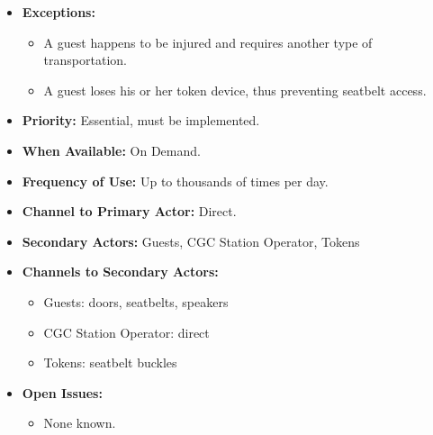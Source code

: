 \documentclass[12pt]{article}
\begin{document}
\begin{itemize}
        \item[]\textbf{Exceptions:}
            \begin{itemize}
                \item[] A guest happens to be injured and requires another type of transportation.
                \item[] A guest loses his or her token device, thus preventing seatbelt access.
            \end{itemize}

        \item[]\textbf{Priority:}
            Essential, must be implemented.

        \item[]\textbf{When Available:}
            On Demand.

        \item[]\textbf{Frequency of Use:}
            Up to thousands of times per day.
            
        \item[]\textbf{Channel to Primary Actor:}
            Direct.

        \item[]\textbf{Secondary Actors:}
            Guests, CGC Station Operator, Tokens
            
        \item[]\textbf{Channels to Secondary Actors:}
            \begin{itemize}
                \item[] Guests: doors, seatbelts, speakers
                \item[] CGC Station Operator: direct
                \item[] Tokens: seatbelt buckles
            \end{itemize}

        \item[]\textbf{Open Issues:}
            \begin{itemize}
                \item[] None known.
            \end{itemize}
    \end{itemize}
    
    
    
\end{document}
